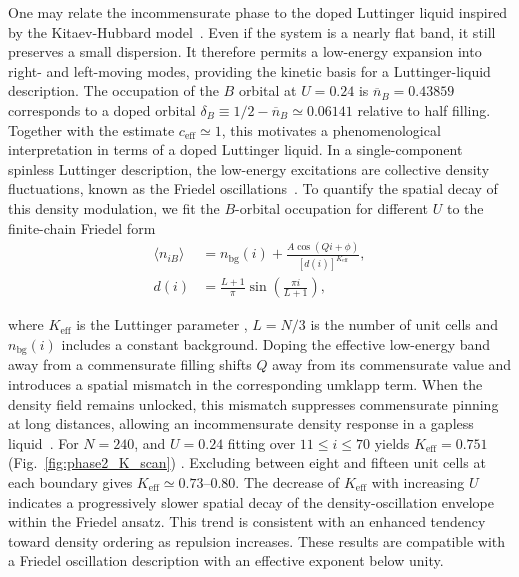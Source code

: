 \documentclass[
  prb,
  reprint,
  superscriptaddress,
  amsmath,
  amssymb,
  longbibliography
]{revtex4-2}
\begin{document}
One may relate the incommensurate phase to the doped Luttinger liquid inspired by the Kitaev-Hubbard model~\cite{mahyaehStudyPhaseDiagram2020,rahmaniPhaseDiagramInteracting2015,stoudenmireInteractionEffectsTopological2011a}. Even if the system is a nearly flat band, it still preserves a small dispersion. It therefore permits a low-energy expansion into right-
and left-moving modes, providing the kinetic basis for a
Luttinger-liquid description. The occupation of the $B$ orbital at $U=0.24$ is
$\overline{n}_B=0.43859$ corresponds to a doped orbital
$\delta_B\equiv1/2-\overline{n}_B\simeq0.06141$
relative to half filling. Together with the estimate
$c_{\mathrm{eff}}\simeq1$, this motivates a phenomenological
interpretation in terms of a doped Luttinger liquid.
In a single-component spinless Luttinger description, the
low-energy excitations are collective density fluctuations, known as the Friedel oscillations~\cite{Voit1995}. To quantify the spatial decay of this density modulation,
we fit the $B$-orbital occupation for different $U$ to the
finite-chain Friedel form ~\cite{eggerFriedelOscillationsLuttinger1996}
\begin{equation}
\begin{split}
\langle n_{iB}\rangle
&=n_{\mathrm{bg}}(i)
+\frac{A\cos(Qi+\phi)}{[d(i)]^{K_{\mathrm{eff}}}},\\
d(i)&=\frac{L+1}{\pi}
\sin\!\left(\frac{\pi i}{L+1}\right),
\end{split}
\label{eq:friedel_fit}
\end{equation}

where $K_{\mathrm{eff}}$ is the Luttinger parameter , $L=N/3$ is the number of unit cells and
$n_{\mathrm{bg}}(i)$ includes a constant background. Doping the effective low-energy band away
from a commensurate filling shifts $Q$ away from its
commensurate value and introduces a spatial mismatch in the
corresponding umklapp term. When the density field remains
unlocked, this mismatch suppresses commensurate pinning at
long distances, allowing an incommensurate density response
in a gapless liquid~\cite{Giamarchi1997}.
For $N=240$, and $U=0.24$ fitting over $11\leq i\leq70$ yields
$K_{\mathrm{eff}}=0.751$ (Fig.~\ref{fig:phase2_K_scan}) .
Excluding between eight and fifteen unit cells at
each boundary gives $K_{\mathrm{eff}}\simeq0.73$--$0.80$.
The decrease of $K_{\mathrm{eff}}$ with increasing $U$
indicates a progressively slower spatial decay of the
density-oscillation envelope within the Friedel ansatz.
This trend is consistent with an enhanced tendency
toward density ordering as repulsion increases.
These results are compatible with a Friedel oscillation
description with an effective exponent below unity.
\end{document}
